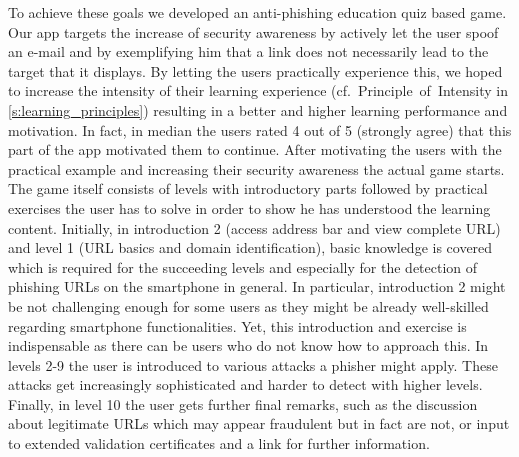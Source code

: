 To achieve these goals we developed an anti-phishing education quiz based game.
Our app targets the increase of security awareness by actively let the user spoof an e-mail and by exemplifying him that a link does not necessarily lead to the target that it displays.
By letting the users practically experience this, we hoped to increase the intensity of their learning experience (cf.~Principle~of~Intensity in \autoref{s:learning_principles}) resulting in a better and higher learning performance and motivation. In fact, in median the users rated 4 out of 5 (strongly agree) that this part of the app motivated them to continue.
After motivating the users with the practical example and increasing their security awareness the actual game starts.
The game itself consists of levels with introductory parts followed by practical exercises the user has to solve in order to show he has understood the learning content.
Initially, in introduction 2 (access address bar and view complete URL) and level 1 (URL basics and domain identification), basic knowledge is covered which is required for the succeeding levels and especially for the detection of phishing URLs on the smartphone in general.
In particular, introduction 2 might be not challenging enough for some users as they might be already well-skilled regarding smartphone functionalities.
Yet, this introduction and exercise is indispensable as there can be users who do not know how to approach this.
In levels 2-9 the user is introduced to various attacks a phisher might apply.
These attacks get increasingly sophisticated and harder to detect with higher levels.
Finally, in level 10 the user gets further final remarks, such as the discussion about legitimate URLs which may appear fraudulent but in fact are not, or input to extended validation certificates and a link for further information.

